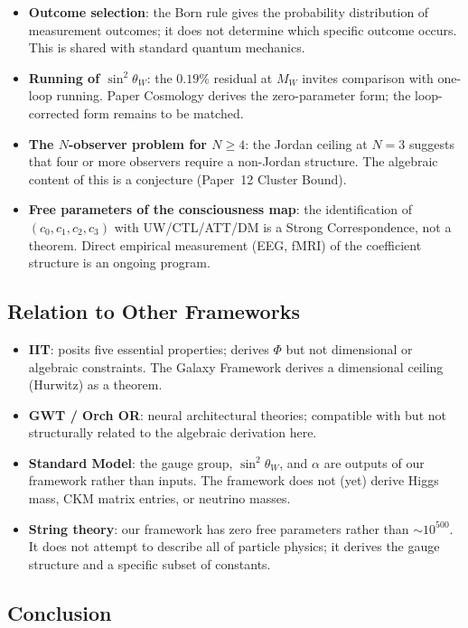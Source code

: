 \documentclass[11pt, a4paper]{article}
\begin{document}
\begin{itemize}[nosep]
\item \textbf{Outcome selection}: the Born rule gives the probability
distribution of measurement outcomes; it does not determine which
specific outcome occurs. This is shared with standard quantum
mechanics.
\item \textbf{Running of $\sin^2\theta_W$}: the $0.19\%$ residual at
$M_W$ invites comparison with one-loop running. Paper Cosmology
derives the zero-parameter form; the loop-corrected form remains to
be matched.
\item \textbf{The $N$-observer problem for $N \geq 4$}: the Jordan
ceiling at $N = 3$ suggests that four or more observers require a
non-Jordan structure. The algebraic content of this is a conjecture
(Paper~12 Cluster Bound).
\item \textbf{Free parameters of the consciousness map}: the
identification of $(c_0, c_1, c_2, c_3)$ with UW/CTL/ATT/DM is a
Strong Correspondence, not a theorem. Direct empirical measurement
(EEG, fMRI) of the coefficient structure is an ongoing program.
\end{itemize}

\subsection{Relation to Other Frameworks}

\begin{itemize}[nosep]
\item \textbf{IIT}: posits five essential properties; derives $\Phi$
but not dimensional or algebraic constraints. The Galaxy Framework
derives a dimensional ceiling (Hurwitz) as a theorem.
\item \textbf{GWT / Orch OR}: neural architectural theories; compatible
with but not structurally related to the algebraic derivation here.
\item \textbf{Standard Model}: the gauge group, $\sin^2\theta_W$,
and $\alpha$ are outputs of our framework rather than inputs. The
framework does not (yet) derive Higgs mass, CKM matrix entries, or
neutrino masses.
\item \textbf{String theory}: our framework has zero free parameters
rather than $\sim 10^{500}$. It does not attempt to describe
all of particle physics; it derives the gauge structure and a specific
subset of constants.
\end{itemize}

\subsection{Conclusion}
\end{document}
